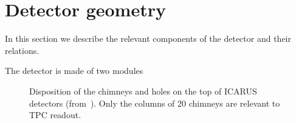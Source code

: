 \section{Detector geometry}
\label{sec:geometry}

In this section we describe the relevant components of the detector and their relations.

The detector is made of two modules

\begin{figure}[p]
  \caption{
    Disposition of the chimneys and holes on the top of ICARUS detectors (from~\cite{SBNDocDBxxxx:ConnTest}).
    Only the columns of 20 chimneys are relevant to TPC readout.
    \label{fig:chimneys}
  }
\end{figure}
